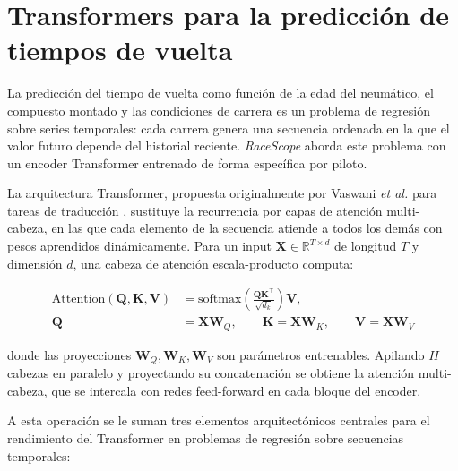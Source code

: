 \section{Transformers para la predicción de tiempos de vuelta}
\label{sec:transformers_pace}

La predicción del tiempo de vuelta como función de la edad del neumático, el compuesto montado y las condiciones de carrera es un problema de regresión sobre series temporales: cada carrera genera una secuencia ordenada en la que el valor futuro depende del historial reciente. \textit{RaceScope} aborda este problema con un encoder Transformer entrenado de forma específica por piloto.

La arquitectura Transformer, propuesta originalmente por Vaswani \textit{et al.} para tareas de traducción \cite{vaswani2017attention}, sustituye la recurrencia por capas de atención multi-cabeza, en las que cada elemento de la secuencia atiende a todos los demás con pesos aprendidos dinámicamente. Para un input $\mathbf{X} \in \mathbb{R}^{T \times d}$ de longitud $T$ y dimensión $d$, una cabeza de atención escala-producto computa:

\begin{equation}
    \begin{aligned}
        \mathrm{Attention}(\mathbf{Q},\mathbf{K},\mathbf{V})
        &= \mathrm{softmax}\!\left(\frac{\mathbf{Q}\mathbf{K}^{\top}}{\sqrt{d_k}}\right)\mathbf{V}, \\
        \mathbf{Q} &= \mathbf{X}\mathbf{W}_{Q}, \qquad
        \mathbf{K} = \mathbf{X}\mathbf{W}_{K}, \qquad
        \mathbf{V} = \mathbf{X}\mathbf{W}_{V}
    \end{aligned}
\end{equation}

donde las proyecciones $\mathbf{W}_Q, \mathbf{W}_K, \mathbf{W}_V$ son parámetros entrenables. Apilando $H$ cabezas en paralelo y proyectando su concatenación se obtiene la atención multi-cabeza, que se intercala con redes feed-forward en cada bloque del encoder.

A esta operación se le suman tres elementos arquitectónicos centrales para el rendimiento del Transformer en problemas de regresión sobre secuencias temporales:

